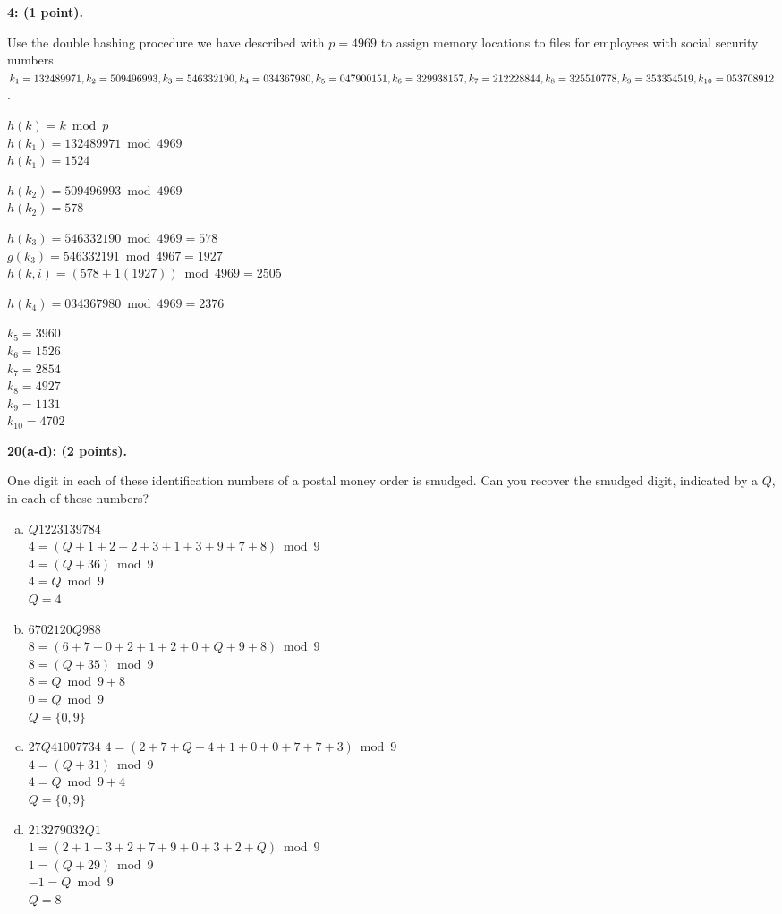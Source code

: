 \documentclass[12pt]{article}  %
\begin{document}
\noindent
{\bf 4: (1 point).}

\noindent
Use the double hashing procedure we have described with $p=4969$ to assign memory locations to files for employees with social security numbers  $k_1=132489971,k_2=509496993,\\k_3=546332190,k_4=034367980,k_5=047900151,k_6=329938157,k_7=212228844,\\k_8=325510778,k_9=353354519,k_{10}=053708912$.

\noindent
$h(k)=k\bmod{p}$\\
$h(k_1)=132489971\bmod{4969}$\\
$h(k_1)=1524$

\noindent
$h(k_2)=509496993\bmod{4969}$\\
$h(k_2)=578$

\noindent
$h(k_3)=546332190\bmod{4969}=578$\\
$g(k_3)=546332191\bmod{4967}=1927$\\
$h(k,i)=(578+1(1927))\bmod{4969}=2505$

\noindent
$h(k_4)=034367980\bmod{4969}=2376$

\noindent
$k_5=3960$\\
$k_6=1526$\\
$k_7=2854$\\
$k_8=4927$\\
$k_9=1131$\\
$k_{10}=4702$

\noindent
{\bf 20(a-d): (2 points).}

\noindent
One digit in each of these identification numbers of a postal money order is smudged. Can you recover the smudged digit, indicated by a $Q$, in each of these numbers?
\begin{enumerate}[a)]
    \item $Q1223139784$\\
    $4=(Q+1+2+2+3+1+3+9+7+8)\bmod{9}$\\
    $4=(Q+36)\bmod{9}$\\
    $4=Q\bmod{9}$\\
    $Q=4$
    
    \clearpage
    \item $6702120Q988$\\
    $8=(6+7+0+2+1+2+0+Q+9+8)\bmod{9}$\\
    $8=(Q+35)\bmod{9}$\\
    $8=Q\bmod{9}+8$\\
    $0=Q\bmod{9}$\\
    $Q=\{0,9\}$
    
    \item $27Q41007734$
    $4=(2+7+Q+4+1+0+0+7+7+3)\bmod{9}$\\
    $4=(Q+31)\bmod{9}$\\
    $4=Q\bmod{9}+4$\\
    $Q=\{0,9\}$
    
    \item $213279032Q1$\\
    $1=(2+1+3+2+7+9+0+3+2+Q)\bmod{9}$\\
    $1=(Q+29)\bmod{9}$\\
    $-1=Q\bmod{9}$\\
    $Q=8$
\end{enumerate}
\end{document}
